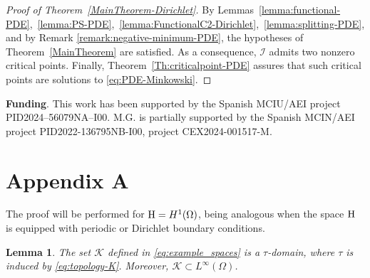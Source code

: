 \documentclass{article}
\newcommand{\boK}{\mathcal{K}}
\newcommand{\boI}{\mathcal{I}}
\newcommand{\Hilb}{{\textnormal H}}
\newtheorem{lemma}{Lemma}[section]
\theoremstyle{definition}
\begin{document}
\begin{proof}[Proof of Theorem~\ref{MainTheorem-Dirichlet}]
 By  Lemmas~\ref{lemma:functional-PDE},~\ref{lemma:PS-PDE},~\ref{lemma:FunctionalC2-Dirichlet},~\ref{lemma:splitting-PDE}, and by Remark \ref{remark:negative-minimum-PDE}, the hypotheses of Theorem~\ref{MainTheorem} are satisfied. As a consequence, $\boI$ admits two nonzero critical points. Finally, 
 Theorem~\ref{Th:criticalpoint-PDE} assures that such critical points are solutions to \eqref{eq:PDE-Minkowski}.
\end{proof}
		
{\bf Funding}. This work has been supported by the Spanish MCIU/AEI project PID2024–56079NA–I00. M.G. is partially supported by the Spanish MCIN/AEI project PID2022-136795NB-I00, project CEX2024-001517-M.	
		
		
		
\appendix

\section*{Appendix A}
\makeatletter
\def\@currentlabel{A} %
\makeatother
\label{appendix-lemma}
\gdef\thelemma{A.\arabic{lemma}}
\setcounter{lemma}{0}
The proof will be performed for $\Hilb=H^1(\Omega)$, being analogous when the space $\Hilb$ is equipped with periodic or Dirichlet boundary conditions.
\begin{lemma}\label{appendix-lemma:tau-domain}
        The set $\boK$ defined in \eqref{eq:example_spaces} is a $\tau$-domain, where $\tau$ is induced by \eqref{eq:topology-K}. Moreover, $\boK\subset L^\infty(\Omega)$.
        \end{lemma}
\end{document}
